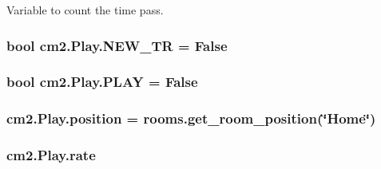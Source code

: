 Variable to count the time pass. 

\subsubsection[{\texorpdfstring{N\+E\+W\+\_\+\+TR}{NEW_TR}}]{\setlength{\rightskip}{0pt plus 5cm}bool cm2.\+Play.\+N\+E\+W\+\_\+\+TR = False\hspace{0.3cm}{\ttfamily [static]}}\hypertarget{classcm2_1_1Play_ac55ece5d83e26bbc6d388510349c2b85}{}\label{classcm2_1_1Play_ac55ece5d83e26bbc6d388510349c2b85}
\subsubsection[{\texorpdfstring{P\+L\+AY}{PLAY}}]{\setlength{\rightskip}{0pt plus 5cm}bool cm2.\+Play.\+P\+L\+AY = False\hspace{0.3cm}{\ttfamily [static]}}\hypertarget{classcm2_1_1Play_a7c234a400b24301b31af0bd23d48e3f7}{}\label{classcm2_1_1Play_a7c234a400b24301b31af0bd23d48e3f7}
\subsubsection[{\texorpdfstring{position}{position}}]{\setlength{\rightskip}{0pt plus 5cm}cm2.\+Play.\+position = rooms.\+get\+\_\+room\+\_\+position(\char`\"{}Home\char`\"{})\hspace{0.3cm}{\ttfamily [static]}}\hypertarget{classcm2_1_1Play_a7d95099e35917fe5d3954cb6ba02a07d}{}\label{classcm2_1_1Play_a7d95099e35917fe5d3954cb6ba02a07d}
\subsubsection[{\texorpdfstring{rate}{rate}}]{\setlength{\rightskip}{0pt plus 5cm}cm2.\+Play.\+rate}\hypertarget{classcm2_1_1Play_a4f8427d5a6c4eaeaa0e171879dbf6b21}{}\label{classcm2_1_1Play_a4f8427d5a6c4eaeaa0e171879dbf6b21}
